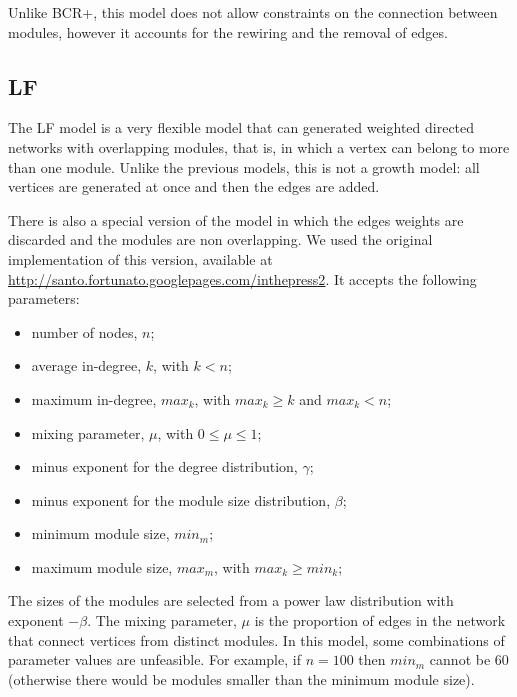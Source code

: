 Unlike BCR+, this model does not allow constraints on the connection between
modules, however it accounts for the rewiring and the removal of edges. 

\subsection{LF}

The LF model \cite{Lancichinetti2009} is a very flexible model that can
generated weighted directed networks with overlapping modules, that is, in which
a vertex can belong to more than one module. Unlike the previous models, this is
not a growth model: all vertices are generated at once and then the edges are
added.

There is also a special version of the model in which the edges weights are
discarded and the modules are non overlapping. We used the original
implementation of this version, available at
\url{http://santo.fortunato.googlepages.com/inthepress2}. It accepts the following
parameters:

\begin{itemize}
\item number of nodes, $n$;
\item average in-degree, $k$, with $k < n$;
\item maximum in-degree, $max_k$, with $max_k \ge k$ and $max_k < n$;
\item mixing parameter, $\mu$, with $0 \le \mu \le 1$;
\item minus exponent for the degree distribution, $\gamma$;
\item minus exponent for the module size distribution, $\beta$;
\item minimum module size, $min_m$;
\item maximum module size, $max_m$, with $max_k \ge min_k$;
\end{itemize}

The sizes of the modules are selected from a power law distribution with
exponent $-\beta$. The mixing parameter, $\mu$ is the proportion of edges in the
network that connect vertices from distinct modules. In this model, some
combinations of parameter values are unfeasible. For example, if $n = 100$ then
$min_m$ cannot be 60 (otherwise there would be modules smaller than the minimum
module size).


